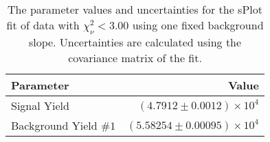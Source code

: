 
\begin{table}[ht]
    \begin{center}
        \begin{tabular}{lr}\toprule
            Parameter & Value \\\midrule
            Signal Yield & $(4.7912 \pm 0.0012) \times 10^{4}$ \\
            Background Yield $\#1$ & $(5.58254 \pm 0.00095) \times 10^{4}$ \\\bottomrule
        \end{tabular}
        \caption{The parameter values and uncertainties for the sPlot fit of data with $\chi^2_\nu < 3.00$ using one fixed background slope. Uncertainties are calculated using the covariance matrix of the fit.}\label{tab:splot-fit-results-chisqdof-3.00-fixed-1}
    \end{center}
\end{table}
